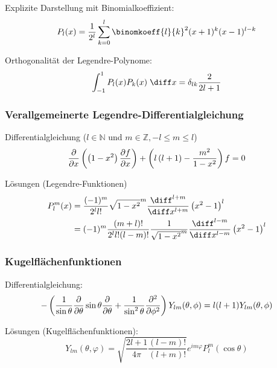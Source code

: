 \documentclass[11pt]{article}
\numberwithin{equation}{section}
\begin{document}
        Explizite Darstellung mit Binomialkoeffizient:
        \begin{equation}
          P_l(x)=\frac{1}{2^l} \sum_{k=0}^{l}\binomkoeff{l}{k}^2(x+1)^k(x-1)^{l-k}
        \end{equation}

        Orthogonalität der Legendre-Polynome:
        \begin{equation}
          \int_{-1}^1 P_l(x) P_k(x)\;\diff x = \delta_{lk} \frac{2}{2l+1}
        \end{equation}

      \subsubsection{Verallgemeinerte Legendre-Differentialgleichung}
        Differentialgleichung ($l\in\mathbb{N}$ und $m\in\mathbb{Z}, -l\le m\le l$)
        \begin{equation}
          \frac{\partial }{\partial x}\left(\left(1-x^2\right)\frac{\partial f}{\partial x}\right)+\left(l\left(l+1\right)-\frac{m^2}{1-x^2}\right)f= 0
        \end{equation}

        Lösungen (Legendre-Funktionen)
        \begin{equation}
          \begin{aligned}
            P_l^m(x) &= \frac{(-1)^m}{2^l l!}\sqrt{1-x^2}^m
            \frac{\diff^{l+m}}{\diff x^{l+m}}\left(x^2-1\right)^l \\
            &= (-1)^m \frac{(m+l)!}{2^l l! (l-m)!}\frac{1}{\sqrt{1-x^2}^m}
            \frac{\diff^{l-m}}{\diff x^{l-m}}\left(x^2-1\right)^l \\
          \end{aligned}
        \end{equation}

      \subsubsection{Kugelflächenfunktionen}
        Differentialgleichung:
        \begin{equation}
          -\left(
            \frac{1}{\sin\theta}\frac{\partial }{\partial \theta}\sin\theta\frac{\partial }{\partial \theta} + \frac{1}{\sin^2\theta}\frac{\partial^2}{\partial \phi^2}
          \right)
          Y_{lm}(\theta,\phi) = l(l+1)Y_{lm}(\theta,\phi)
        \end{equation}

        Lösungen (Kugelflächenfunktionen):
        \begin{equation} \label{eq:kugelflächenfunktionen}
          Y_{lm}(\theta,\varphi) = \sqrt{\frac{2l+1}{4\pi}\frac{(l-m)!}{(l+m)!}} e^{im\varphi} P_l^m(\cos\theta)
        \end{equation}
\end{document}
